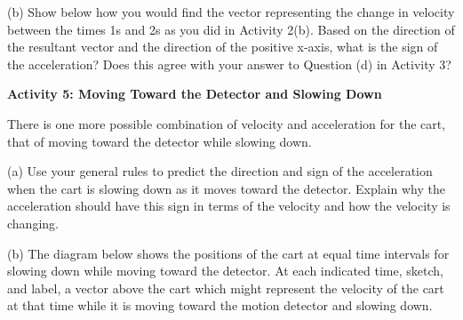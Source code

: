 (b) Show below how you would find the vector representing the change in velocity
between the times 1s and 2s as you did in Activity 2(b). Based on the 
direction of the resultant vector and the direction of the positive x-axis, 
what is the sign of the acceleration? 
Does this agree with your answer to Question (d) in Activity 3?
\vspace{20mm}

\textbf{Activity 5: Moving Toward the Detector and Slowing Down }

There is one more possible combination of velocity and acceleration for the
cart, that of moving toward the detector while slowing down. 


(a) Use your general rules to predict the direction and sign of the acceleration
when the cart is slowing down as it moves toward the detector. Explain why the
acceleration should have this sign in terms of the velocity and how the 
velocity is changing. 
\answerspace{15mm}

(b) The diagram below shows the positions of the cart at equal time intervals
for slowing down while moving toward the detector. At each indicated time, 
sketch, and label,
a vector above the cart which might represent the velocity of the cart at that
time while it is moving toward the motion detector and slowing down.

